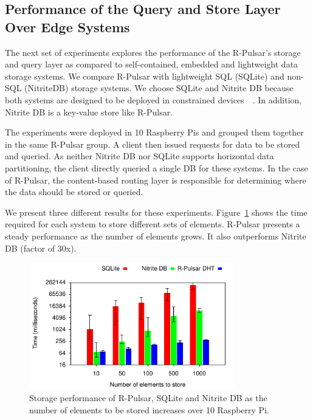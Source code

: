 \subsection{Performance of the Query and Store Layer Over Edge Systems}

The next set of experiments explores the performance of the R-Pulsar's storage and query layer as compared to self-contained, embedded and lightweight data storage systems. We compare R-Pulsar with lightweight SQL (SQLite) and non-SQL (NitriteDB) storage systems. We choose SQLite and Nitrite DB because  both systems are designed to be deployed in constrained devices~\cite{sqlite}~\cite{nitrite}. In addition, Nitrite DB is a key-value store like R-Pulsar. 

The experiments were deployed in 10 Raspberry Pis and grouped them together in the same R-Pulsar group. A client then issued requests for data to be stored and queried. As neither Nitrite DB nor SQLite supports horizontal data partitioning, the client directly queried a single DB for these systems. In the case of R-Pulsar, the content-based routing layer is responsible for determining where the data should be stored or queried.

We present three different results for these experiments. Figure~\ref{fig:DBInsertBar} shows the time required for each system to store different sets of elements. R-Pulsar presents a steady performance as the number of elements grows. It also outperforms Nitrite DB (factor of 30x).

\begin{figure}[h!]
  \centering
  \includegraphics[width=0.8\textwidth]{Results/DBInsertBar}
  \caption{Storage performance of R-Pulsar, SQLite and Nitrite DB as the number of elements to be stored increases over 10 Raspberry Pi.}
  \label{fig:DBInsertBar}
\end{figure}

